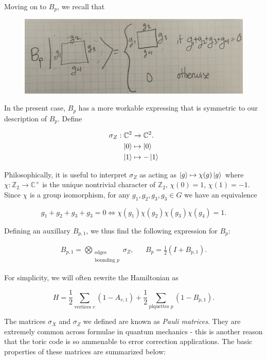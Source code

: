 \documentclass{article}
\theoremstyle{definition}
\newcommand{\ZZ}{\mathbb{Z}}
\newcommand{\CC}{\mathbb{C}}
\newcommand{\0}{\left|0\right>}
\newcommand{\1}{\left|1\right>}
\numberwithin{figure}{section}
\begin{document}
Moving on to $B_p$, we recall that

\begin{figure}[h]
\begin{center}
\includegraphics[scale=.04]{Bp-definition}
\end{center}
\end{figure}

In the present case, $B_p$ has a more workable expressing that is symmetric to our description of $B_p$. Define

\begin{align*}
\sigma_Z:\CC^2&\xrightarrow{}\CC^2.\\
\ket{0}&\mapsto \ket{0}\\
\ket{1}&\mapsto -\ket{1}
\end{align*}

Philosophically, it is useful to interpret $\sigma_Z$ as acting as $\ket{g}\mapsto \chi(g)\ket{g}$ where $\chi:\ZZ_2\to\CC^\times$ is the unique nontrivial character of $\ZZ_2$, $\chi(0)=1$, $\chi(1)=-1$. Since $\chi$ is a group isomorphism, for any $g_1,g_2,g_3,g_3\in G$ we have an equivalence

$$g_1+g_2+g_3+g_3=0 \iff \chi(g_1)\chi(g_2)\chi(g_3)\chi(g_4)=1.$$

Defining an auxillary $B_{p,1}$, we thus find the following expression for $B_p$:

\begin{align*}
B_{p,1}=\bigotimes_{\substack{\text{edges} \\ \text{bounding }p}}\sigma_Z, && B_p=\frac{1}{2}\left(I + B_{p,1}\right).
\end{align*}

For simplicity, we will often rewrite the Hamiltonian as

$$H=\frac{1}{2}\sum_{\text{vertices }v}(1-A_{v,1})+\frac{1}{2}\sum_{\text{plquettes }p}(1-B_{p,1}).$$

The matrices $\sigma_X$ and $\sigma_Z$ we defined are known as \textit{Pauli matrices}. They are extremely common across formulae in quantum mechanics - this is another reason that the toric code is so ammenable to error correction applications. The basic properties of these matrices are summarized below:
\end{document}
